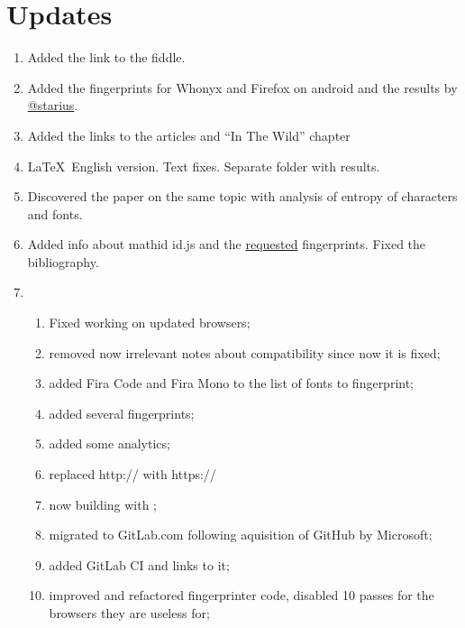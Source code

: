 \documentclass[letterpaper,14pt]{article}
\begin{document}
\section{Updates}\label{updates}
\begin{enumerate}
\itemsep1pt\parskip0pt
\item
  Added the link to the fiddle.
\item
  Added the fingerprints for Whonyx and Firefox on android and the
  results by \href{https://geektimes.ru/users/starius/}{@starius}.
\item
  Added the links to the articles and ``In The Wild'' chapter
\item
   \LaTeX\ English version. Text fixes. Separate folder with results.
\item
   Discovered the paper\cite{Fifield2015} on the same topic with analysis of entropy of characters and fonts.
\item
   Added info about mathid id.js and the \href{https://trac.torproject.org/projects/tor/ticket/13400#comment:12}{requested} fingerprints. Fixed the bibliography.
\item \begin{enumerate}
   \item Fixed working on updated browsers;
   \item removed now irrelevant notes about compatibility since now it is fixed;
   \item added Fira Code and Fira Mono to the list of fonts to fingerprint;
   \item added several fingerprints;
   \item added some analytics;
   \item replaced http:// with https://
   \item now building with \XeTeX;
   \item migrated to GitLab.com following aquisition of GitHub by Microsoft;
   \item added GitLab CI and links to it;
   \item improved and refactored fingerprinter code, disabled 10 passes for the browsers they are useless for;
   \end{enumerate}
\end{enumerate}
{\footnotesize}
\appendix
\end{document}
